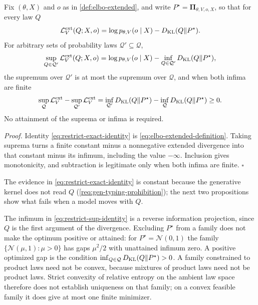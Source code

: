 Fix $(\theta,X)$ and $o$ as in \cref{def:elbo-extended}, and write
$P^\star=\boldsymbol\Pi_{\theta,V,o,X}$, so that for every law $Q$
\begin{equation}
\mathcal L_V^{\mathrm{ext}}(Q;X,o)=\log p_{\theta,V}(o\mid X)-D_{\mathrm{KL}}(Q\Vert P^\star).
\label{eq:restrict-exact-identity}
\end{equation}
For arbitrary sets of probability laws $\mathcal Q'\subseteq\mathcal Q$,
\begin{equation}
\sup_{Q\in\mathcal Q'}\mathcal L_V^{\mathrm{ext}}(Q;X,o)
=\log p_{\theta,V}(o\mid X)-\inf_{Q\in\mathcal Q'}D_{\mathrm{KL}}(Q\Vert P^\star),
\label{eq:restrict-sup-identity}
\end{equation}
the supremum over $\mathcal Q'$ is at most the supremum over $\mathcal Q$, and
when both infima are finite
\begin{equation}
\sup_{\mathcal Q}\mathcal L_V^{\mathrm{ext}}-\sup_{\mathcal Q'}\mathcal L_V^{\mathrm{ext}}
=\inf_{\mathcal Q'}D_{\mathrm{KL}}(Q\Vert P^\star)-\inf_{\mathcal Q}D_{\mathrm{KL}}(Q\Vert P^\star)\geq0.
\label{eq:restrict-loss}
\end{equation}
No attainment of the suprema or infima is required. 

\noindent\emph{Proof.}
Identity \eqref{eq:restrict-exact-identity} is
\eqref{eq:elbo-extended-definition}. Taking suprema turns a finite constant
minus a nonnegative extended divergence into that constant minus its infimum,
including the value $-\infty$. Inclusion gives monotonicity, and subtraction is
legitimate only when both infima are finite. \hfill$\square$

The evidence in \eqref{eq:restrict-exact-identity} is constant because the
generative kernel does not read $Q$ (\cref{req:gen-typing-prohibition}); the
next two propositions show what fails when a model moves with $Q$.

The infimum in \eqref{eq:restrict-sup-identity} is a reverse information
projection, since $Q$ is the first argument of the divergence. Excluding
$P^\star$ from a family does not make the optimum positive or attained: for
$P^\star=\mathcal N(0,1)$ the family $\{\mathcal N(\mu,1):\mu>0\}$ has gaps
$\mu^2/2$ with unattained infimum zero. A positive optimized gap is the
condition $\inf_{Q\in\mathcal Q}D_{\mathrm{KL}}(Q\Vert P^\star)>0$. A family constrained to
product laws need not be convex, because mixtures of product laws need not be
product laws. Strict convexity of relative entropy on the ambient law space
therefore does not establish uniqueness on that family; on a convex feasible
family it does give at most one finite minimizer. 

